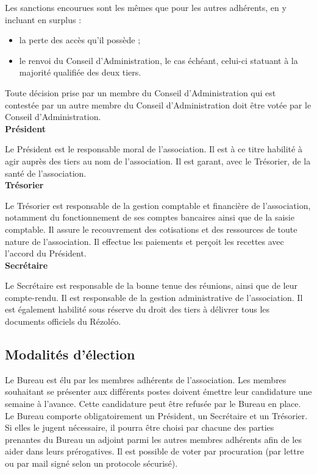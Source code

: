 \documentclass[12pt]{article}
\begin{document}
		Les sanctions encourues sont les mêmes que pour les autres adhérents, en y incluant en surplus :

		\begin{itemize}                       
 			\item[\textbullet] la perte des accès qu’il possède ;
 			\item[\textbullet] le renvoi du Conseil d’Administration, le cas échéant, celui-ci statuant à la majorité qualifiée des deux tiers.
 		\end{itemize}
		Toute décision prise par un membre du Conseil d’Administration qui est contestée par un autre membre du Conseil d’Administration doit être votée par le Conseil d’Administration.\\

		\textbf{Président}

		Le Président est le responsable moral de l’association. Il est à ce titre habilité à agir auprès des tiers au nom de l’association. Il est garant, avec le Trésorier, de la santé de l’association.\\

		\textbf{Trésorier}

		Le Trésorier est responsable de la gestion comptable et financière de l’association, notamment du fonctionnement de ses comptes bancaires ainsi que de la saisie comptable. Il assure le recouvrement des cotisations et des ressources de toute nature de l’association. Il effectue les paiements et perçoit les recettes avec l’accord du Président.\\

		\textbf{Secrétaire}

		Le Secrétaire est responsable de la bonne tenue des réunions, ainsi que de leur compte-rendu. Il est responsable de la gestion administrative de l’association. Il est également habilité sous réserve du droit des tiers à délivrer tous les documents officiels du Rézoléo.\\

    \subsection{Modalités d'élection}

		Le Bureau est élu par les membres adhérents de l’association. Les membres souhaitant se présenter aux différents postes doivent émettre leur candidature une semaine à l’avance. Cette candidature peut être refusée par le Bureau en place. Le Bureau comporte obligatoirement un Président, un Secrétaire et un Trésorier. Si elles le jugent nécessaire, il pourra être choisi par chacune des parties prenantes du Bureau un adjoint parmi les autres membres adhérents afin de les aider dans leurs prérogatives. Il est possible de voter par procuration (par lettre ou par mail signé selon un protocole sécurisé).
\end{document}
